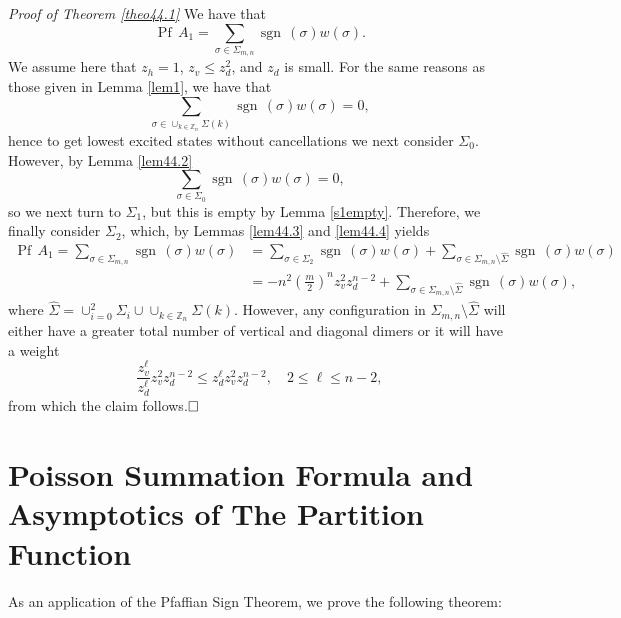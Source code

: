 \documentclass[12pt,reqno]{amsart}
\numberwithin{equation}{section}
\newcommand{\sg}{\sigma}
\newcommand{\Pf}{{\operatorname{Pf}\,}}
\newcommand{\sgn}{{\operatorname{sgn}\,}}
\begin{document}
{\it Proof of Theorem \ref{theo44.1}}
We have that
\begin{equation}\label{PfA1}
\Pf A_1=\sum_{\sg\in\Sigma_{m,n}}\sgn(\sg)w(\sg).
\end{equation}
We assume here that $z_h=1$, $z_v\le z_d^2$, and $z_d$ is small. For the same reasons as those given in Lemma \ref{lem1}, we have that 
\begin{equation}
\sum_{\sg\in\cup_{k\in\mathbb Z_n}\Sigma(k)}\sgn(\sg)w(\sg)=0,
\end{equation}
hence to get lowest excited states without cancellations we next consider $\Sigma_0$. However, by Lemma \ref{lem44.2} 
\begin{equation}
\sum_{\sg\in\Sigma_0}\sgn(\sg)w(\sg)=0,
\end{equation}
so we next turn to $\Sigma_1$, but this is empty by Lemma \ref{s1empty}. Therefore, we finally consider $\Sigma_2$, which, by Lemmas \ref{lem44.3} and \ref{lem44.4} yields
\begin{equation}
\begin{aligned}
\Pf A_1=\sum_{\sg\in\Sigma_{m,n}}\sgn(\sg)w(\sg)&=\sum_{\sg\in \Sigma_2}\sgn(\sg)w(\sg)+\sum_{\sg\in\Sigma_{m,n}\setminus\hat{\Sigma}}\sgn(\sg)w(\sg)\\
&=-n^2\left(\frac{m}{2}\right)^nz_v^2z_d^{n-2}+\sum_{\sg\in\Sigma_{m,n}\setminus\hat{\Sigma}}\sgn(\sg)w(\sg),
\end{aligned}
\end{equation}
where $\hat{\Sigma}=\cup_{i=0}^2\Sigma_i\cup\cup_{k\in\mathbb Z_n}\Sigma(k)$. However, any configuration in $\Sigma_{m,n}\setminus\hat{\Sigma}$ will either have a greater total number of vertical and diagonal dimers or it will have a weight 
\begin{equation}
\frac{z_v^\ell}{z_d^\ell}z_v^2z_d^{n-2}\le z_d^\ell z_v^2z_d^{n-2},\quad 2\le \ell \le n-2,
\end{equation}
from which the claim follows.$\hfill \square$

\section{Poisson Summation Formula and Asymptotics of The Partition Function}\label{Poisson}

As an application of the Pfaffian Sign Theorem, we prove the following theorem:
\end{document}

